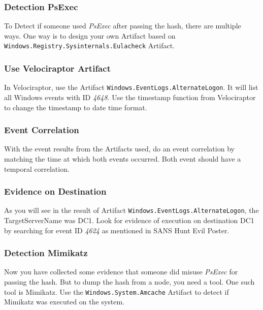 \subsubsection{Detection PsExec}
To Detect if someone used \textit{PsExec} after passing the hash, there are multiple ways. One way is to design your own Artifact based on \lstinline|Windows.Registry.Sysinternals.Eulacheck| Artifact.

\subsubsection{Use Velociraptor Artifact}
In Velociraptor, use the Artifact \lstinline|Windows.EventLogs.AlternateLogon|. It will list all Windows events with ID \textit{4648}. Use the timestamp function from Velociraptor to change the timestamp to date time format.

\subsubsection{Event Correlation}
With the event results from the Artifacts used, do an event correlation by matching the time at which both events occurred. Both event should have a temporal correlation.

\subsubsection{Evidence on Destination}
As you will see in the result of Artifact \lstinline|Windows.EventLogs.AlternateLogon|, the TargetServerName was DC1. Look for evidence of execution on destination DC1 by searching for event ID \textit{4624} as mentioned in SANS Hunt Evil Poster.

\subsubsection{Detection Mimikatz}
Now you have collected some evidence that someone did misuse \textit{PsExec} for passing the hash. But to dump the hash from a node, you need a tool. One such tool is Mimikatz. Use the \lstinline|Windows.System.Amcache| Artifact to detect if Mimikatz was executed on the system.
